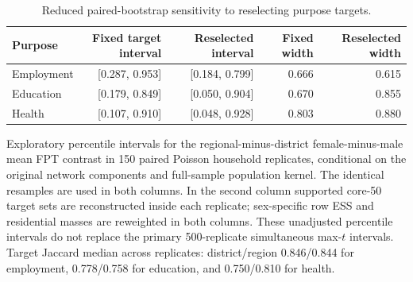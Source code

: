 \begin{table}[ht]
\centering
\caption{Reduced paired-bootstrap sensitivity to reselecting purpose targets.}
\label{tab:s13_reselected_targets}
\begin{tabular}{lrrrr}
\toprule
Purpose & Fixed target interval & Reselected interval & Fixed width & Reselected width \\
\midrule
Employment & [0.287, 0.953] & [0.184, 0.799] & 0.666 & 0.615 \\
Education & [0.179, 0.849] & [0.050, 0.904] & 0.670 & 0.855 \\
Health & [0.107, 0.910] & [0.048, 0.928] & 0.803 & 0.880 \\
\bottomrule
\end{tabular}

\smallskip
\footnotesize Exploratory percentile intervals for the regional-minus-district female-minus-male mean FPT contrast in 150 paired Poisson household replicates, conditional on the original network components and full-sample population kernel. The identical resamples are used in both columns. In the second column supported core-50 target sets are reconstructed inside each replicate; sex-specific row ESS and residential masses are reweighted in both columns. These unadjusted percentile intervals do not replace the primary 500-replicate simultaneous max-$t$ intervals. Target Jaccard median across replicates: district/region 0.846/0.844 for employment, 0.778/0.758 for education, and 0.750/0.810 for health.
\end{table}
